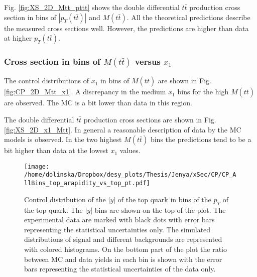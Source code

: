 Fig. \ref{fig:XS_2D_Mtt_pttt} shows the double differential $t\bar{t}$ production cross section in bins of $|p_{T}(t\bar{t})|$ and $M(t\bar{t})$.
All the theoretical predictions describe the measured cross sections well. However, the predictions are higher than data at higher $p_{T}(t\bar{t})$.

% 
% 

\subsubsection{Cross section in bins of $M(t\bar{t})$ versus $x_{1}$}

The control distributions of $x_{1}$ in bins of $M(t\bar{t})$ are shown in Fig. \ref{fig:CP_2D_Mtt_x1}. A discrepancy in the medium $x_{1}$ bins for the 
high $M(t\bar{t})$ are observed. The MC is a bit lower than data in this region.

The double differential $t\bar{t}$ production cross sections are shown in Fig. \ref{fig:XS_2D_x1_Mtt}. In general a reasonable description of data by the MC
models is observed. In the two highest $M(t\bar{t})$ bins the predictions tend to be a bit higher than data at the lowest $x_{1}$ values.




\begin{figure}[H]
  \centering
  \texttt{[image: /home/dolinska/Dropbox/desy\_plots/Thesis/Jenya/xSec/CP/CP\_AllBins\_top\_arapidity\_vs\_top\_pt.pdf]}
  \caption{Control distribution of the $|y|$ of the top quark in bins of the $p_{T}$ of the top quark. The $|y|$ bins are shown on the top 
  of the plot. The experimental data are marked with black dots with error bars representing the statistical uncertainties only. The simulated 
  distributions of signal and different backgrounds are represented with colored histograms. On the bottom part of the plot the ratio between 
  MC and data yields in each bin is shown with the error bars representing the statistical uncertainties of the data only.}
  \label{fig:CP_2D_y_pt}
\end{figure}

